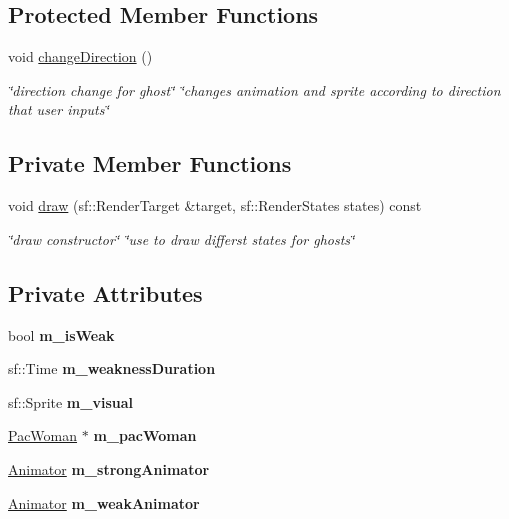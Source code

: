 \subsection*{Protected Member Functions}
\begin{DoxyCompactItemize}
\item 
\mbox{\label{classGhost_a08831fa01afa61f91365ce82cf33bf1b}} 
void \hyperlink{classGhost_a08831fa01afa61f91365ce82cf33bf1b}{change\+Direction} ()
\begin{DoxyCompactList}\small\item\em \char`\"{}direction change for ghost\char`\"{}  \char`\"{}changes animation and sprite according to direction that user inputs\char`\"{} \end{DoxyCompactList}\end{DoxyCompactItemize}
\subsection*{Private Member Functions}
\begin{DoxyCompactItemize}
\item 
void \hyperlink{classGhost_a6e53afb38446db1eac42cb6529e314ad}{draw} (sf\+::\+Render\+Target \&target, sf\+::\+Render\+States states) const
\begin{DoxyCompactList}\small\item\em \char`\"{}draw constructor\char`\"{}  \char`\"{}use to draw differst states for ghosts\char`\"{} \end{DoxyCompactList}\end{DoxyCompactItemize}
\subsection*{Private Attributes}
\begin{DoxyCompactItemize}
\item 
\mbox{\label{classGhost_a1bf800e23e4fcf6edd81909715b8d42a}} 
bool {\bfseries m\+\_\+is\+Weak}
\item 
\mbox{\label{classGhost_a3908562081e28b6b797807cfba70a5f1}} 
sf\+::\+Time {\bfseries m\+\_\+weakness\+Duration}
\item 
\mbox{\label{classGhost_a2ed5af6d34f0b57838dae852d845be45}} 
sf\+::\+Sprite {\bfseries m\+\_\+visual}
\item 
\mbox{\label{classGhost_a8e2a2f496a465b6d7cd14406ec6a9c8e}} 
\hyperlink{classPacWoman}{Pac\+Woman} $\ast$ {\bfseries m\+\_\+pac\+Woman}
\item 
\mbox{\label{classGhost_ad7fd67d6954f9f84984b09c4a1761af5}} 
\hyperlink{classAnimator}{Animator} {\bfseries m\+\_\+strong\+Animator}
\item 
\mbox{\label{classGhost_a10b92c7cc4283807902c328a350f9536}} 
\hyperlink{classAnimator}{Animator} {\bfseries m\+\_\+weak\+Animator}
\end{DoxyCompactItemize}


